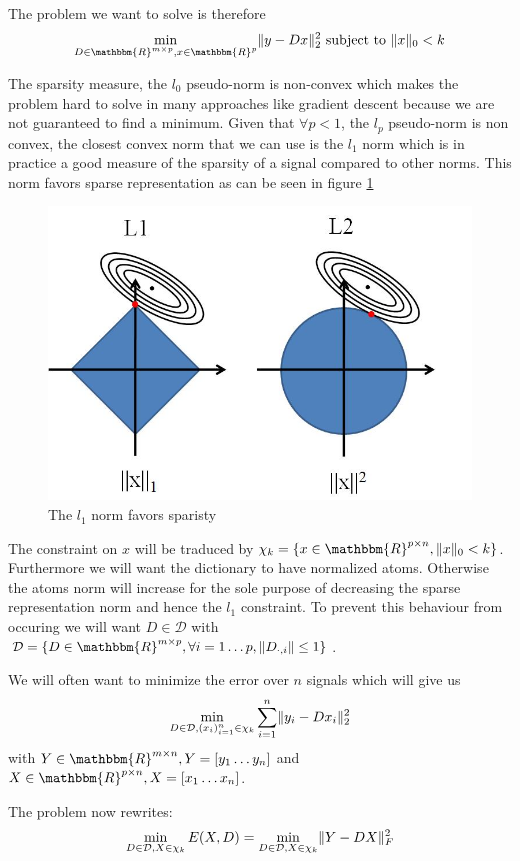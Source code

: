 \documentclass[a4paper,11pt]{article}
\newcommand{\RR}{\mathbbm{R}} %
\DeclarePairedDelimiter\norm{\lVert}{\rVert} %
\begin{document}
The problem we want to solve is therefore
$$\min\limits_{D \in \RR^{m \times p}, x \in \RR^p} \norm{y - Dx}_2^2  \text{  subject to  } \norm{x}_0<k$$


The sparsity measure, the $l_0$ pseudo-norm is non-convex which makes the problem hard to solve in many approaches like gradient descent because we are not guaranteed to find a minimum.
Given that $\forall p <1$, the $l_p$ pseudo-norm is non convex, the closest convex norm that we can use is the $l_1$ norm which is in practice a good measure of the sparsity of a signal compared to other norms.
This norm favors sparse representation as can be seen in figure \ref{l1l2_norm}

\begin{figure}[!htbp]
\centering
  \includegraphics[width=0.5\linewidth]{l1l2_norm.jpg}
  \caption{The $l_1$ norm favors sparisty}
  \label{l1l2_norm}
\end{figure}

The constraint on $x$ will be traduced by $\chi_k = \{ x \in \RR^{p \times n}, \norm{x}_0<k \}$.
Furthermore we will want the dictionary to have normalized atoms.
Otherwise the atoms norm will increase for the sole purpose of decreasing the sparse representation norm and hence the $l_1$ constraint.
To prevent this behaviour from occuring we  will want $ D \in \mathcal{D} $ with $\mathcal{D} = \{ D \in \RR^{m \times p}, \forall i=1 \ldots p, \norm{D_{\cdot,i}} \leq 1 \}$.

We will often want to minimize the error over $n$ signals which will give us
$$\min\limits_{D \in \mathcal{D}, (x_i)_{i=1}^n \in \chi_k} \sum\limits_{i=1}^n \norm{y_i - Dx_i}_2^2$$
with $Y \in \RR^{m \times n}, Y = [y_1 \ldots y_n]$ and $X \in \RR^{p \times n}, X = [x_1 \ldots x_n]$.

The problem now rewrites:
\begin{equation} \label{eq:1}
\min\limits_{D \in \mathcal{D}, X \in \chi_k} E(X,D) = \min\limits_{D \in \mathcal{D}, X \in \chi_k} \norm{Y - DX}_F^2
\end{equation}
\end{document}
